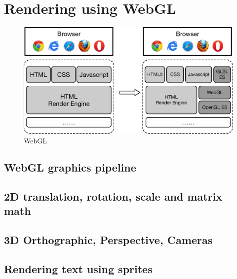 \chapter{Rendering using WebGL}

\begin{figure}[htb]
  \centering
  \includegraphics[width=.9\textwidth]{Assets/WebGL_HTML5}
  \caption{WebGL}
\end{figure}

\section{WebGL graphics pipeline}
\section{2D translation, rotation, scale and matrix math}
\section{3D Orthographic, Perspective, Cameras}
\section{Rendering text using sprites} 